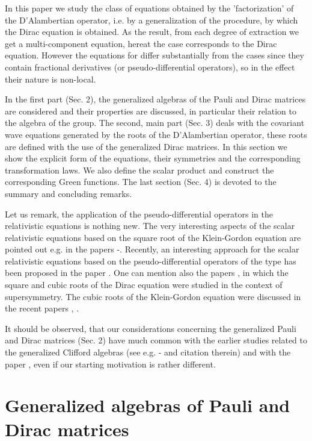 \documentclass[a4paper,a4paper]{article}
\begin{document}
In this paper we study the class of equations obtained by the
'factorization' of the D'Alambertian operator, i.e. by a generalization of
the procedure, by which the Dirac equation is obtained. As the result, from
each degree of extraction \coordHE{} we get a multi-component equation, hereat the
case \coordHE{} corresponds to the Dirac equation. However the equations for \coordHE{}
differ substantially from the cases \coordHE{} since they contain fractional
derivatives (or pseudo-differential operators), so in the effect their
nature is non-local.

In the first part (Sec. 2), the generalized algebras of the Pauli and Dirac
matrices are considered and their properties are discussed, in particular
their relation to the algebra of the \coordHE{} group. The second, main part
(Sec. 3) deals with the covariant wave equations generated by the roots of
the D'Alambertian operator, these roots are defined with the use of the
generalized Dirac matrices. In this section we show the explicit form of the
equations, their symmetries and the corresponding transformation laws. We
also define the scalar product and construct the corresponding Green
functions. The last section (Sec. 4) is devoted to the summary and
concluding remarks.

Let us remark, the application of the pseudo-differential operators in the
relativistic equations is nothing new. The very interesting aspects of the
scalar relativistic equations based on the square root of the Klein-Gordon
equation are pointed out e.g. in the papers \cite{suc}-\cite{smi}. Recently,
an interesting approach for the scalar relativistic equations based on the
pseudo-differential operators of the type \coordHE{} has been proposed in
the paper \cite{bar}. One can mention also the papers \cite{szw}, \cite{ker}
in which the square and cubic roots of the Dirac equation were studied in
the context of supersymmetry. The cubic roots of the Klein-Gordon equation
were discussed in the recent papers \cite{ply}, \cite{ras}.

It should be observed, that our considerations concerning the generalized
Pauli and Dirac matrices (Sec. 2) have much common with the earlier studies
related to the generalized Clifford algebras (see e.g. \cite{ram}-\cite{tra}
and citation therein) and with the paper \cite{pat}, even if our starting
motivation is rather different.

\section{Generalized algebras of Pauli and Dirac matrices}
\end{document}

